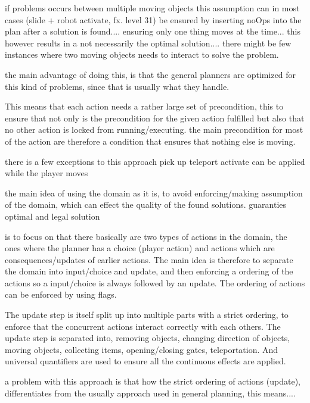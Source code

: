 		
		if problems occurs between multiple moving objects 
		this assumption can in most cases (slide + robot activate, fx. level 31) be ensured by inserting noOps into the plan after a solution is found.... ensuring only one thing moves at the time... this however results in a not necessarily the optimal solution.... there might be few instances where two moving objects needs to interact to solve the problem. 
		
		
		
		the main advantage of doing this, is that the general planners are optimized for this kind of problems, since that is usually what they handle.
		
		
		
		This means that each action needs a rather large set of precondition, this to ensure that not only is the precondition for the given action fulfilled but also that no other action is locked from running/executing. the main precondition for most of the action are therefore a condition that ensures that nothing else is moving.
		
		there is a few exceptions to this approach
			pick up
			teleport
			activate
				can be applied while the player moves
		
		
		the main idea of using the domain as it is, to avoid enforcing/making assumption of the domain, which can effect the quality of the found solutions.
		guaranties optimal and legal solution
		
		is to focus on that there basically are two types of actions in the domain, the ones where the planner has a choice (player action) and actions which are consequences/updates of earlier actions. The main idea is therefore to separate the domain into input/choice and update, and then enforcing a ordering of the actions so a input/choice is always followed by an update. The ordering of actions can be enforced by using flags.	
		
		The update step is itself split up into multiple parts with a strict ordering, to enforce that the concurrent actions interact correctly with each others. The update step is separated into, removing objects, changing direction of objects, moving objects, collecting items, opening/closing gates, teleportation. And universal quantifiers are used to ensure all the continuous effects are applied.
		
		a problem with this approach is that how the strict ordering of actions (update), differentiates from the usually approach used in general planning, this means....
	
